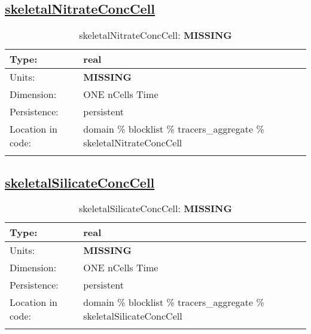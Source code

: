 \subsection[skeletalNitrateConcCell]{\hyperref[sec:var_tab_tracers_aggregate]{skeletalNitrateConcCell}}
\label{subsec:var_sec_tracers_aggregate_skeletalNitrateConcCell}
\begin{center}
\begin{longtable}{| p{2.0in} | p{4.0in} |}
        \hline 
        Type: & real \\
        \hline 
        Units: & {\bf \color{red} MISSING} \\
        \hline 
        Dimension: & ONE nCells Time \\
        \hline 
        Persistence: & persistent \\
        \hline 
         Location in code: & domain \% blocklist \% tracers\_aggregate \% skeletalNitrateConcCell \\
         \hline 
    \caption{skeletalNitrateConcCell: {\bf \color{red} MISSING}}
\end{longtable}
\end{center}
\subsection[skeletalSilicateConcCell]{\hyperref[sec:var_tab_tracers_aggregate]{skeletalSilicateConcCell}}
\label{subsec:var_sec_tracers_aggregate_skeletalSilicateConcCell}
\begin{center}
\begin{longtable}{| p{2.0in} | p{4.0in} |}
        \hline 
        Type: & real \\
        \hline 
        Units: & {\bf \color{red} MISSING} \\
        \hline 
        Dimension: & ONE nCells Time \\
        \hline 
        Persistence: & persistent \\
        \hline 
         Location in code: & domain \% blocklist \% tracers\_aggregate \% skeletalSilicateConcCell \\
         \hline 
    \caption{skeletalSilicateConcCell: {\bf \color{red} MISSING}}
\end{longtable}
\end{center}
